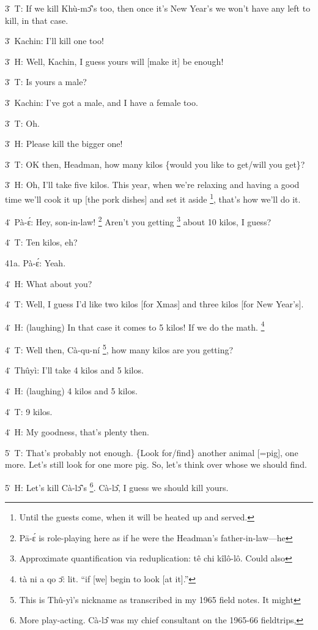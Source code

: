 3\. T: If we kill Khù-mɔ̂'s too, then once it's New Year's we won't have any
left to kill, in that case.

3\. Kachin: I'll kill one too!

3\. H: Well, Kachin, I guess yours will [make it] be enough!

3\. T: Is yours a male?

3\. Kachin: I've got a male, and I have a female too.

3\. T: Oh.

3\. H: Please kill the bigger one!

3\. T: OK then, Headman, how many kilos \{would you like to get/will you get\}?

3\. H: Oh, I'll take five kilos.  This year, when we're relaxing and having a good
time we'll cook it up [the pork dishes] and set it aside \footnote{Until the guests come, when it will be heated up and served.}, that's how we'll
do it.

4\. Pà-ɛ́: Hey, son-in-law! \footnote{Pā-ɛ́ is role-playing here as if he were the Headman's father-in-law---he} Aren't you getting \footnote{Approximate quantification via reduplication: tê chi kîlô-lô.  Could also} about 10 kilos, I guess?

4\. T: Ten kilos, eh?

41a. Pà-ɛ́: Yeah.

4\. H: What about you?

4\. T: Well, I guess I'd like two kilos [for Xmas] and three kilos [for New Year's].

4\. H: (laughing) In that case it comes to 5 kilos!  If we do the math. \footnote{tà ni a qo ɔ̄: lit. ``if [we] begin to look [at it].''}

4\. T: Well then, Cà-qu-ní \footnote{This is Thû-yì's nickname as transcribed in my 1965 field notes.  It might}, how many kilos are you getting?

4\. Thûyì: I'll take 4 kilos and 5 kilos.

4\. H: (laughing) 4 kilos and 5 kilos.

4\. T: 9 kilos.

4\. H: My goodness, that's plenty then.

5\. T: That's probably not enough.  \{Look for/find\} another animal [=pig], one
more.  Let's still look for one more pig.  So, let's think over whose we should
find.

5\. H: Let's kill Cà-lɔ̂'s \footnote{More play-acting.  Cà-lɔ̂ was my chief consultant on the 1965-66 fieldtrips,}. Cà-lɔ̂, I guess we should kill yours.

